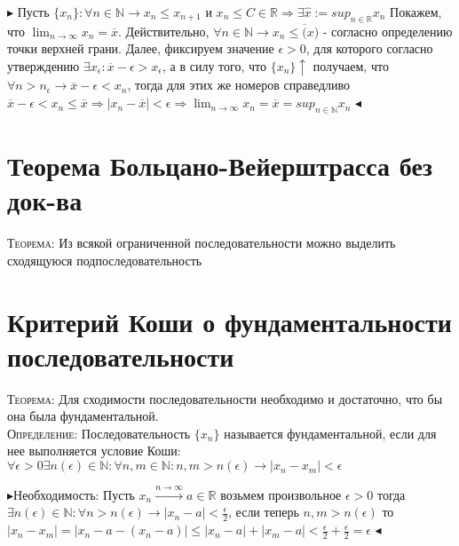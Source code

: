 \documentclass[14pt]{article}
\begin{document}
        $\blacktriangleright$ 
        Пусть $\{x_n\}:\forall n \in \mathbb{N} \rightarrow x_n \leqslant x_{n+1} $ и $x_n \leqslant C \in \mathbb{R} \Rightarrow \exists \hat{x} := sup_{n\in\mathbb{R}}x_n$ Покажем, что $\lim_{n \rightarrow \infty} x_n = \overline{x}$. Действительно, $\forall n \in \mathbb{N} \rightarrow x_n \leqslant \overline(x)$ - согласно определению точки верхней грани. Далее, фиксируем значение $\epsilon > 0$, для которого согласно утверждению $\exists x_\epsilon:\overline{x}-\epsilon > x_\epsilon$, а в силу того, что $\{x_n\} \uparrow $ получаем, что $\forall n > n_\epsilon \rightarrow \overline{x} - \epsilon < x_n$, тогда для этих же номеров справедливо $\overline{x} - \epsilon < x_n \leqslant \overline{x} \Rightarrow |x_n - \overline{x}| < \epsilon \Rightarrow \lim_{n\rightarrow \infty} x_n = \overline{x} = sup_{n \in \mathbb{N} } x_n $
        $\blacktriangleleft$\\

    \section{Теорема Больцано-Вейерштрасса без док-ва}
        \textsc{Теорема:} Из всякой ограниченной последовательности можно выделить сходящуюся подпоследовательность

    \section{Критерий Коши о фундаментальности последовательности}
        \textsc{Теорема:} Для сходимости последовательности необходимо и достаточно, что бы она была фундаментальной. \\ 
        \textsc{Определение:} Последовательность $\{x_n\}$ называется фундаментальной, если для нее выполняется условие Коши: $\forall \epsilon > 0 \exists n(\epsilon) \in \mathbb{N}: \forall n,m \in \mathbb{N} : n,m > n(\epsilon) \rightarrow |x_n - x_m| < \epsilon$   

        $\blacktriangleright$Необходимость: Пусть $x_n \xrightarrow{n \rightarrow \infty} a \in \mathbb{R}$ возьмем произвольное $\epsilon > 0$ тогда $\exists n(\epsilon)\in \mathbb{N}:\forall n > n(\epsilon) \rightarrow |x_n - a| < \frac{\epsilon}{2} $, если теперь $n,m>n(\epsilon)$ то $|x_n - x_m| = |x_n - a - (x_n - a)| \leqslant |x_n - a| + |x_m - a| < \frac{\epsilon}{2} + \frac{\epsilon}{2} = \epsilon $ $\blacktriangleleft$
\end{document}

